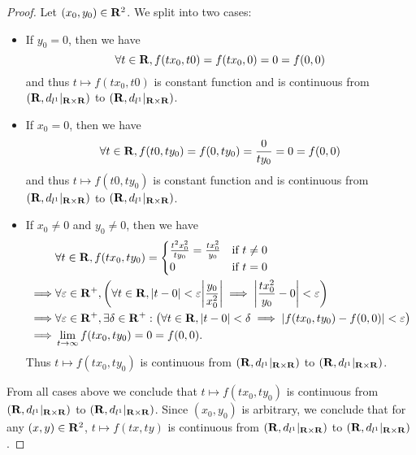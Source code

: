 \begin{proof}
    Let \((x_0, y_0) \in \mathbf{R}^2\).
    We split into two cases:
    \begin{itemize}
        \item If \(y_0 = 0\), then we have
              \[
                  \forall t \in \mathbf{R}, f(t x_0, t0) = f(t x_0, 0) = 0 = f(0, 0)
              \]
              and thus \(t \mapsto f(t x_0, t0)\) is constant function and is continuous from \((\mathbf{R}, d_{l^1}|_{\mathbf{R} \times \mathbf{R}})\) to \((\mathbf{R}, d_{l^1}|_{\mathbf{R} \times \mathbf{R}})\).
        \item If \(x_0 = 0\), then we have
              \[
                  \forall t \in \mathbf{R}, f(t0, t y_0) = f(0, t y_0) = \frac{0}{t y_0} = 0 = f(0, 0)
              \]
              and thus \(t \mapsto f(t0, t y_0)\) is constant function and is continuous from \((\mathbf{R}, d_{l^1}|_{\mathbf{R} \times \mathbf{R}})\) to \((\mathbf{R}, d_{l^1}|_{\mathbf{R} \times \mathbf{R}})\).
        \item If \(x_0 \neq 0\) and \(y_0 \neq 0\), then we have
              \begin{align*}
                           & \forall t \in \R, f(t x_0, t y_0) = \begin{cases}
                                                                     \frac{t^2 x_0^2}{t y_0} = \frac{t x_0^2}{y_0} & \text{if } t \neq 0 \\
                                                                     0                                             & \text{if } t = 0
                                                                 \end{cases}                                                            \\
                  \implies & \forall \varepsilon \in \R^+, \bigg(\forall t \in \R, \abs{t - 0} < \varepsilon \abs{\frac{y_0}{x_0^2}} \implies \abs{\frac{t x_0^2}{y_0} - 0} < \varepsilon\bigg) \\
                  \implies & \forall \varepsilon \in \R^+, \exists \delta \in \R^+ : \big(\forall t \in \R, \abs{t - 0} < \delta \implies \abs{f(t x_0, t y_0) - f(0, 0)} < \varepsilon\big)    \\
                  \implies & \lim_{t \to \infty} f(t x_0, t y_0) = 0 = f(0, 0).
              \end{align*}
              Thus \(t \mapsto f(t x_0, t y_0)\) is continuous from \((\mathbf{R}, d_{l^1}|_{\mathbf{R} \times \mathbf{R}})\) to \((\mathbf{R}, d_{l^1}|_{\mathbf{R} \times \mathbf{R}})\).
    \end{itemize}
    From all cases above we conclude that \(t \mapsto f(t x_0, t y_0)\) is  continuous from \((\mathbf{R}, d_{l^1}|_{\mathbf{R} \times \mathbf{R}})\) to \((\mathbf{R}, d_{l^1}|_{\mathbf{R} \times \mathbf{R}})\).
    Since \((x_0, y_0)\) is arbitrary, we conclude that for any \((x, y) \in \mathbf{R}^2\), \(t \mapsto f(tx, ty)\) is continuous from \((\mathbf{R}, d_{l^1}|_{\mathbf{R} \times \mathbf{R}})\) to \((\mathbf{R}, d_{l^1}|_{\mathbf{R} \times \mathbf{R}})\).


\end{proof}
